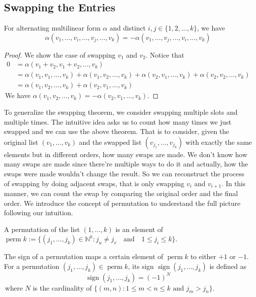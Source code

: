 \subsection{Swapping the Entries}
\begin{theorem}
    For alternating multilinear form $\alpha$ and distinct $i,j \in \{1,2,\ldots,k\}$, we have
    $$\alpha(v_1, \ldots, v_i, \ldots, v_j, \ldots, v_k) = -\alpha(v_1, \ldots, v_j, \ldots, v_i, \ldots, v_k)$$
\end{theorem}
\begin{proof}
    We show the case of swapping $v_1$ and $v_2$. Notice that 
    $$\begin{aligned}
        0 &= \alpha(v_1 + v_2, v_1 + v_2, \ldots, v_k)\\
        &= \alpha(v_1, v_1, \ldots, v_k) + \alpha(v_1, v_2, \ldots, v_k) + \alpha(v_2, v_1, \ldots, v_k) + \alpha(v_2, v_2, \ldots, v_k)\\
        &= \alpha(v_1, v_2, \ldots, v_k) + \alpha(v_2, v_1, \ldots, v_k)
    \end{aligned}$$ 
\,We have $\alpha(v_1, v_2, \ldots, v_k) = -\alpha(v_2, v_1, \ldots, v_k).$
\end{proof}

To generalize the swapping theorem, we consider swapping multiple slots and multiple times. The intuitive idea asks us to count how many times we just swapped and we can use the above theorem.
That is to consider, given the original list $(v_1, \ldots, v_k)$ and the swapped list $(v_{j_1},\ldots, v_{j_k})$ with exactly the same elements but in different orders, how many swaps are made. 
We don't know how many swaps are made since there're multiple ways to do it and actually, how the swaps were made wouldn't change the result.
So we can reconstruct the process of swapping by doing adjacent swaps, that is only swapping $v_i$ and $v_{i+1}$. 
In this manner, we can count the swap by comparing the original order and the final order.
We introduce the concept of permutation to understand the full picture following our intuition.

\begin{definition}
    A permutation of the list $(1, \ldots, k)$ is an element of $\operatorname{perm} k := \{(j_1, \ldots, j_k)\in \mathbb{N}^k:j_u\neq j_v \quad\text{and}\quad 1 \leq j_i\leq k \}$.
    
    The sign of a permutation maps a certain element of $\operatorname{perm} k$ to either $+1$ or $-1$. For a permutation $(j_1, \ldots, j_k) \in \operatorname{perm} k$, its sign $\operatorname{sign}(j_1, \ldots, j_k)$ is defined as
$$\operatorname{sign}(j_1, \ldots, j_k) = (-1)^N$$
\,where $N$ is the cardinality of $\{(m,n): 1\leq m < n \leq k \text{ and } j_m > j_n\}$.
\end{definition}

